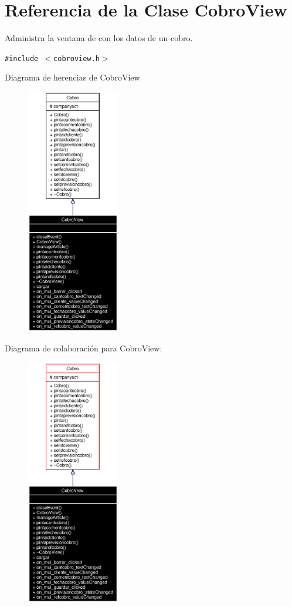 \section{Referencia de la Clase Cobro\-View}
\label{classCobroView}
Administra la ventana de con los datos de un cobro.  


{\tt \#include $<$cobroview.h$>$}

Diagrama de herencias de Cobro\-View\begin{figure}[H]
\begin{center}
\leavevmode
\includegraphics[width=115pt]{classCobroView__inherit__graph}
\end{center}
\end{figure}
Diagrama de colaboraci\'{o}n para Cobro\-View:\begin{figure}[H]
\begin{center}
\leavevmode
\includegraphics[width=115pt]{classCobroView__coll__graph}
\end{center}
\end{figure}
